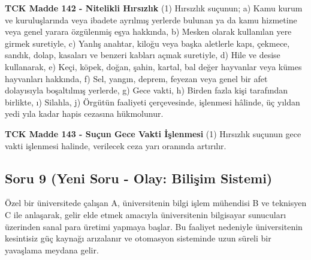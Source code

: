 \documentclass[a4paper, 11pt, twocolumn]{article}
\newenvironment{lawbox}{%
    \par\noindent
    \begin{tcolorbox}[
        colback=lawbg,
        colframe=boxcolor,
        fonttitle=\bfseries,
        boxrule=0.5pt,
        left=3pt,
        right=3pt,
        top=3pt,
        bottom=3pt,
        width=\columnwidth,
        arc=2pt,
        before skip=0.2cm,
        after skip=0.2cm
    ]
    \footnotesize\itshape
}{\end{tcolorbox}}
\begin{document}
\begin{lawbox}
\textbf{TCK Madde 142 - Nitelikli Hırsızlık}
\newline
(1) Hırsızlık suçunun;
a) Kamu kurum ve kuruluşlarında veya ibadete ayrılmış yerlerde bulunan ya da kamu hizmetine veya genel yarara özgülenmiş eşya hakkında,
b) Mesken olarak kullanılan yere girmek suretiyle,
c) Yanlış anahtar, kiloğu veya başka aletlerle kapı, çekmece, sandık, dolap, kasaları ve benzeri kabları açmak suretiyle,
d) Hile ve desise kullanarak,
e) Keçi, köpek, doğan, şahin, kartal, bal değer hayvanlar veya kümes hayvanları hakkında,
f) Sel, yangın, deprem, feyezan veya genel bir afet dolayısıyla boşaltılmış yerlerde,
g) Gece vakti,
h) Birden fazla kişi tarafından birlikte,
ı) Silahla,
j) Örgütün faaliyeti çerçevesinde,
işlenmesi hâlinde, üç yıldan yedi yıla kadar hapis cezasına hükmolunur.
\end{lawbox}
\begin{lawbox}
\textbf{TCK Madde 143 - Suçun Gece Vakti İşlenmesi}
\newline
(1) Hırsızlık suçunun gece vakti işlenmesi halinde, verilecek ceza yarı oranında artırılır.
\end{lawbox}

\newpage

\subsection*{Soru 9 (Yeni Soru - Olay: Bilişim Sistemi)}
Özel bir üniversitede çalışan A, üniversitenin bilgi işlem mühendisi B ve teknisyen C ile anlaşarak, gelir elde etmek amacıyla üniversitenin bilgisayar sunucuları üzerinden sanal para üretimi yapmaya başlar. Bu faaliyet nedeniyle üniversitenin kesintisiz güç kaynağı arızalanır ve otomasyon sisteminde uzun süreli bir yavaşlama meydana gelir.
\end{document}
